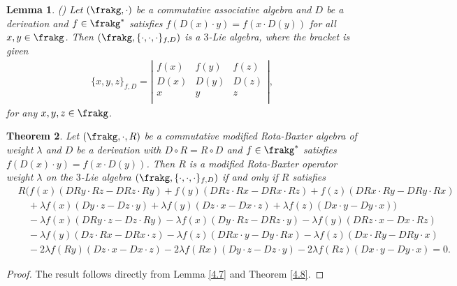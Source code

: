 \documentclass[12pt]{amsart}
\newtheorem{theorem}{Theorem}[section]
\newtheorem{lem}[theorem]{Lemma}
\theoremstyle{definition}
\begin{document}
\begin{lem}(\cite{BGLW13})
Let $(\frakg, \cdot)$ be a commutative associative algebra and  $D$ be a derivation and $f\in \frakg^{\ast}$ satisfies $f(D(x)\cdot y)= f( x\cdot D(y))$  for all $x, y \in  \frakg$. Then $(\frakg, \{\cdot, \cdot, \cdot\}_{f, D})$ is a $3$-Lie algebra, where the bracket is given
\begin{eqnarray}
\{x, y, z\}_{f, D}=\left|
                                            \begin{array}{ccc}
                                              f(x) & f(y) & f(z)\\
                                             D(x) & D(y) & D(z) \\
                                              x & y & z \\
                                            \end{array}
                                          \right|,
\end{eqnarray}
for any $x, y, z\in \frakg$.
\end{lem}
\begin{theorem}
 Let $(\frakg, \cdot, R)$ be a commutative modified Rota-Baxter  algebra of weight $\lambda$ and  $D$ be a derivation with $D\circ R=R\circ D$ and $f\in \frakg^{\ast}$ satisfies $f(D(x)\cdot y)= f( x\cdot D(y))$.  Then $R$ is a modified Rota-Baxter operator weight $\lambda$ on the $3$-Lie algebra $(\frakg, \{\cdot, \cdot, \cdot\}_{f, D})$ if and only if $R$ satisfies
\begin{align*}
&R\Big(f(x)(DRy\cdot Rz-DRz\cdot Ry)+f(y)(DRz\cdot Rx-DRx\cdot Rz)+f(z)(DRx\cdot Ry-DRy\cdot Rx)\\
&\quad+\lambda f(x)(Dy\cdot z-Dz\cdot y)  +\lambda f(y)(Dz\cdot x-Dx\cdot z)+ \lambda f(z)(Dx\cdot y-Dy\cdot x)\Big)\\
&\quad-\lambda f(x)(DRy\cdot z-Dz\cdot Ry)-\lambda f(x)(Dy\cdot Rz-DRz\cdot y) - \lambda f(y)(DRz\cdot x-Dx\cdot Rz)\\
&\quad-\lambda  f(y)(Dz\cdot Rx-DRx\cdot z)-\lambda f(z)(DRx\cdot y-Dy\cdot Rx)-\lambda f(z)(Dx\cdot Ry-DRy\cdot x)\\
&\quad-2\lambda f(Ry)(Dz\cdot x-Dx\cdot z)-2\lambda f(Rx)(Dy\cdot z-Dz\cdot y)-2\lambda f(Rz)(Dx\cdot y-Dy\cdot x)=0.
\end{align*}
\end{theorem}
\begin{proof}
The result follows directly from Lemma \ref{4.7} and Theorem \ref{4.8}.
\end{proof}
\end{document}
